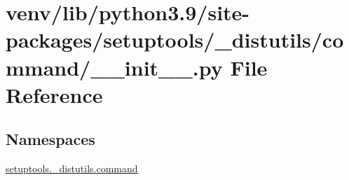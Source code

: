 \hypertarget{venv_2lib_2python3_89_2site-packages_2setuptools_2__distutils_2command_2____init_____8py}{}\section{venv/lib/python3.9/site-\/packages/setuptools/\+\_\+distutils/command/\+\_\+\+\_\+init\+\_\+\+\_\+.py File Reference}
\label{venv_2lib_2python3_89_2site-packages_2setuptools_2__distutils_2command_2____init_____8py}
\subsection*{Namespaces}
\begin{DoxyCompactItemize}
\item 
 \hyperlink{namespacesetuptools_1_1__distutils_1_1command}{setuptools.\+\_\+distutils.\+command}
\end{DoxyCompactItemize}
